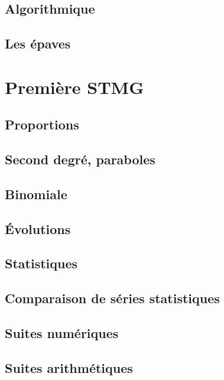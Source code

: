 \documentclass[a4paper,12pt]{book}
\begin{document}
\chapter{Algorithmique}


\chapter{Les épaves}


\part{Première STMG}
\chapter{Proportions}


\chapter{Second degré, paraboles}


\chapter{Binomiale}


\chapter{Évolutions}


\chapter{Statistiques}


\chapter{Comparaison de séries statistiques}


\chapter{Suites numériques}


\chapter{Suites arithmétiques}

\end{document}
